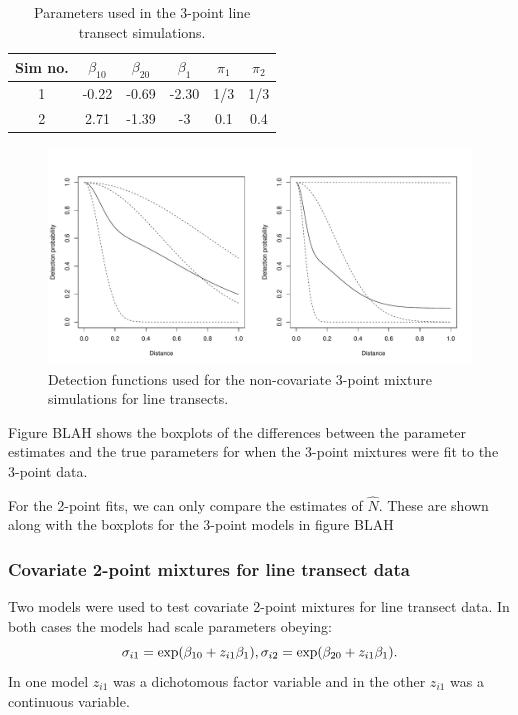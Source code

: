 \begin{table}[h]
\centering
\begin{tabular}{c c c c c c}
Sim no. & $\beta_{10}$ & $\beta_{20}$ & $\beta_1$ & $\pi_1$ & $\pi_2$\\
\hline
\hline
1 & -0.22 & -0.69 & -2.30 & 1/3 & 1/3 \\ 
2 &  2.71 & -1.39 & -3 & 0.1 & 0.4 \\
\end{tabular}
\label{mmds-3pt-simtable}
\caption{Parameters used in the 3-point line transect simulations.}
\end{table}

\begin{figure}
\centering
\includegraphics[width=6in]{mix/figs/3pt-detfcts.pdf}
\caption{Detection functions used for the non-covariate 3-point mixture simulations for line transects.}
\label{mmds-3pt-funcs}
\end{figure}

Figure BLAH shows the boxplots of the differences between the parameter estimates and the true parameters for when the 3-point mixtures were fit to the 3-point data.

For the 2-point fits, we can only compare the estimates of $\hat{N}$. These are shown along with the boxplots for the 3-point models in figure BLAH



\subsubsection{Covariate 2-point mixtures for line transect data}

Two models were used to test covariate 2-point mixtures for line transect data. In both cases the models had scale parameters obeying:
\begin{equation}
\sigma_{i1} = \exp(\beta_{10}+z_{i1} \beta_1),\\
\sigma_{i2} = \exp(\beta_{20}+z_{i1} \beta_1).
\label{mmds-test-covar-formula}
\end{equation}
In one model $z_{i1}$ was a dichotomous factor variable and in the other $z_{i1}$ was a continuous variable.

